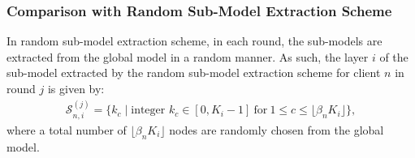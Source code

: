 \documentclass{article}
\begin{document}
\subsubsection{Comparison with Random Sub-Model Extraction Scheme}
%
In random sub-model extraction scheme, in each round, the sub-models are extracted from the global model in a random manner. 
As such, the layer $i$ of the sub-model extracted by the random sub-model extraction scheme for client $n$ in round $j$ is given by:
\begin{align}
    \mathcal{S}^{(j)}_{n,i} = \{k_c \;\vert\; \mbox{integer } k_c \in [0, K_i-1] ~\text{for}~ 1\leq c \leq \lfloor \beta_n K_i\rfloor  \},
\end{align}
where a total number of $\lfloor \beta_n K_i\rfloor$ nodes are randomly chosen from the global model.
\end{document}
